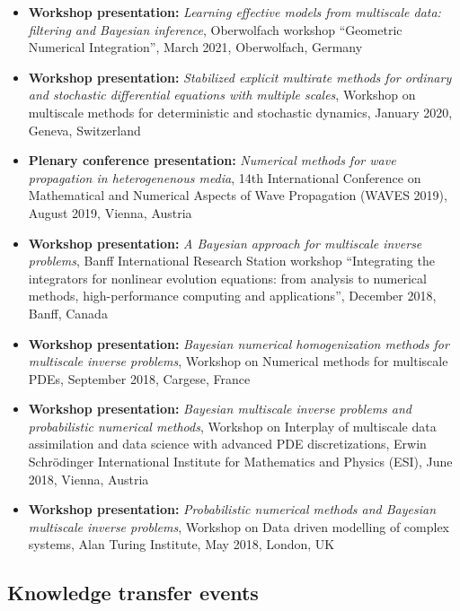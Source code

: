 \documentclass[10pt]{article}
\begin{document}
\begin{itemize}
	\item \textbf{Workshop presentation:} \textit{Learning effective models from multiscale data: filtering and	Bayesian inference}, Oberwolfach workshop ``Geometric Numerical Integration'', March 2021, Oberwolfach, Germany
	\item \textbf{Workshop presentation:} \textit{Stabilized explicit multirate methods for ordinary and stochastic differential equations with multiple scales}, Workshop on multiscale methods for deterministic and stochastic dynamics, January 2020, Geneva, Switzerland
	\item \textbf{Plenary conference presentation:} \textit{Numerical methods for wave propagation in heterogenenous media}, 14th International Conference on Mathematical and Numerical Aspects of Wave Propagation (WAVES 2019), August 2019, Vienna, Austria
	\item \textbf{Workshop presentation:} \textit{A Bayesian approach for multiscale inverse problems}, Banff International Research Station workshop ``Integrating the integrators for nonlinear evolution equations: from analysis to numerical methods, high-performance computing and applications'', December 2018, Banff, Canada
	\item \textbf{Workshop presentation:} \textit{Bayesian numerical homogenization methods for multiscale inverse problems}, Workshop on Numerical methods for multiscale PDEs, September 2018, Cargese, France
	\item \textbf{Workshop presentation:} \textit{Bayesian multiscale inverse problems and probabilistic numerical methods}, Workshop on Interplay of multiscale data assimilation and data science with advanced PDE discretizations, Erwin Schrödinger International Institute for Mathematics and Physics (ESI), June 2018, Vienna, Austria
	\item \textbf{Workshop presentation:} \textit{Probabilistic numerical methods and Bayesian multiscale inverse problems}, Workshop on Data driven modelling of complex systems, Alan Turing Institute, May 2018, London, UK
\end{itemize}

\subsection{Knowledge transfer events}
\end{document}
